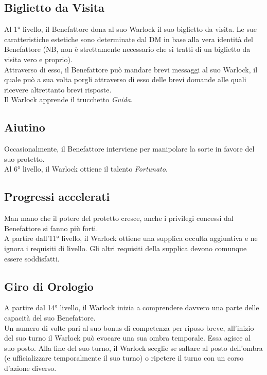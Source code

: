 \subsection{Biglietto da Visita}
Al 1° livello, il Benefattore dona al suo Warlock il suo biglietto da visita. Le sue caratteristiche estetiche sono determinate dal DM in base alla vera identità del Benefattore (NB, non è strettamente necessario che si tratti di un biglietto da visita vero e proprio).\\
Attraverso di esso, il Benefattore può mandare brevi messaggi al suo Warlock, il quale può a sua volta porgli attraverso di esso delle brevi domande alle quali ricevere altrettanto brevi risposte.\\
Il Warlock apprende il trucchetto \textit{Guida}.

\subsection{Aiutino}
Occasionalmente, il Benefattore interviene per manipolare la sorte in favore del suo protetto.\\
Al 6° livello, il Warlock ottiene il talento \textit{Fortunato}.

\subsection{Progressi accelerati}
Man mano che il potere del protetto cresce, anche i privilegi concessi dal Benefattore si fanno più forti.\\
A partire dall'11° livello, il Warlock ottiene una supplica occulta aggiuntiva e ne ignora i requisiti di livello. Gli altri requisiti della supplica devono comunque essere soddisfatti.

\subsection{Giro di Orologio}
A partire dal 14° livello, il Warlock inizia a comprendere davvero una parte delle capacità del suo Benefattore.\\
Un numero di volte pari al suo bonus di competenza per riposo breve, all'inizio del suo turno il Warlock può evocare una sua ombra temporale. Essa agisce al suo posto. Alla fine del suo turno, il Warlock sceglie se saltare al posto dell'ombra (e ufficializzare temporalmente il suo turno) o ripetere il turno con un corso d'azione diverso.